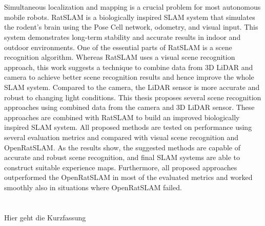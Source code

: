 \chapter{\abstractname}

Simultaneous localization and mapping is a crucial problem for most autonomous mobile robots. RatSLAM is a biologically inspired SLAM system that simulates the rodent's brain using the Pose Cell network, odometry, and visual input. This system demonstrates long-term stability and accurate results in indoor and outdoor environments. One of the essential parts of RatSLAM is a scene recognition algorithm. Whereas RatSLAM uses a visual scene recognition approach, this work suggests a technique to combine data from 3D LiDAR and camera to achieve better scene recognition results and hence improve the whole SLAM system. Compared to the camera, the LiDAR sensor is more accurate and robust to changing light conditions. This thesis proposes several scene recognition approaches using combined data from the camera and 3D LiDAR sensor. These approaches are combined with RatSLAM to build an improved biologically inspired SLAM system. All proposed methods are tested on performance using several evaluation metrics and compared with visual scene recognition and OpenRatSLAM. As the results show, the suggested methods are capable of accurate and robust scene recognition, and final SLAM systems are able to construct suitable experience maps. Furthermore, all proposed approaches outperformed the OpenRatSLAM in most of the evaluated metrics and worked smoothly also in situations where OpenRatSLAM failed.


\makeatletter
{}
{\renewcommand{\abstractname}{Kurzfassung}}
{\renewcommand{\abstractname}{Abstract}}
\makeatother

\chapter{\abstractname}

\begin{otherlanguage}{ngerman}
    Hier geht die Kurzfassung

\end{otherlanguage}


\makeatletter
{}
{\renewcommand{\abstractname}{Abstract}}
{\renewcommand{\abstractname}{Kurzfassung}}
\makeatother